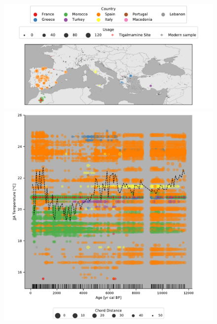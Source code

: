 \begin{refsection}
\begin{figure}
	\captionsetup{width=1.2\linewidth}
	\includegraphics[width=\linewidth]{gridding-figures/tigalmamine-analogue-map.pdf} \\
	\includegraphics[width=\linewidth]{gridding-figures/tigalmamine-analogue-climates.pdf}

\end{figure}
\end{refsection}
